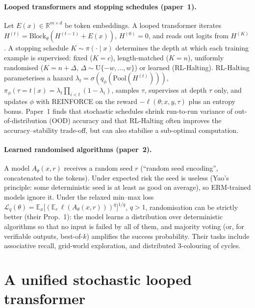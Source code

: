\documentclass[10pt]{article}
\theoremstyle{definition}
\theoremstyle{remark}
\newcommand{\E}{\mathbb{E}}
\newcommand{\R}{\mathbb{R}}
\newcommand{\pistop}{\pi_\phi}
\newcommand{\Lq}{\mathcal{L}_q}
\begin{document}
\paragraph{Looped transformers and stopping schedules (paper~1).}
Let $E(x)\in\R^{m\times d}$ be token embeddings.  A looped transformer iterates
$H^{(t)}=\mathrm{Block}_\theta(H^{(t-1)}+E(x))$, $H^{(0)}=0$, and reads out logits from $H^{(K)}$.  A stopping
schedule $K\sim\pi(\cdot\mid x)$ determines the depth at which each training example is supervised:
fixed ($K=c$), length-matched ($K=n$), uniformly randomised ($K=n+\Delta$, $\Delta\sim\mathrm{U}\{-w,\dots,w\}$) or
learned (RL-Halting).  RL-Halting parameterises a hazard $\lambda_t=\sigma(q_\phi(\mathrm{Pool}(H^{(t)})))$,
$\pistop(\tau=t\mid x)=\lambda_t\prod_{i<t}(1-\lambda_i)$, samples $\tau$, supervises at depth $\tau$ only, and
updates $\phi$ with REINFORCE on the reward $-\ell(\theta;x,y,\tau)$ plus an entropy bonus.  Paper~1 finds that
stochastic schedules shrink run-to-run variance of out-of-distribution (OOD) accuracy and that RL-Halting
often improves the accuracy--stability trade-off, but can also stabilise a sub-optimal computation.

\paragraph{Learned randomised algorithms (paper~2).}
A model $A_\theta(x,r)$ receives a random seed $r$ (``random seed encoding'', concatenated to the tokens).
Under expected risk the seed is useless (Yao's principle: some deterministic seed is at least as good on
average), so ERM-trained models ignore it.  Under the relaxed min--max loss
$\Lq(\theta)=\E_x\big[(\E_r\,\ell(A_\theta(x,r)))^q\big]^{1/q}$, $q>1$, randomisation can be strictly better
(their Prop.~1): the model learns a distribution over deterministic algorithms so that no input is failed by
all of them, and majority voting (or, for verifiable outputs, best-of-$k$) amplifies the success probability.
Their tasks include associative recall, grid-world exploration, and distributed 3-colouring of cycles.

\section{A unified stochastic looped transformer}
\label{sec:framework}
\end{document}

